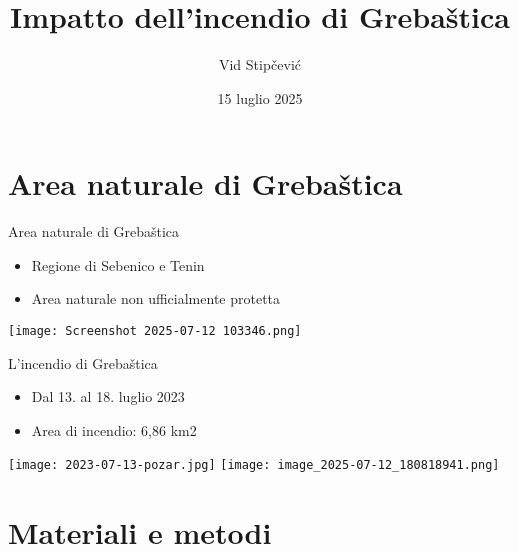 \documentclass{beamer} %
\title{Impatto dell'incendio di Grebaštica}
\author{Vid Stipčević}
\date{15 luglio 2025}
\begin{document}
\maketitle


\section{Area naturale di Grebaštica}

        \begin{frame}{Area naturale di Grebaštica}
                \begin{itemize}
                    \item {Regione di Sebenico e Tenin}
                    \item {Area naturale non ufficialmente protetta}
                \end{itemize}
                \begin{center}
                    \texttt{[image: Screenshot 2025-07-12 103346.png]}
                 \end{center}
        \end{frame}

        \begin{frame}{L'incendio di Grebaštica}
        \begin{multicols}{2}
                \begin{itemize}
                    \item {Dal 13. al 18. luglio 2023} 
                    \item {Area di incendio: 6,86 km2}
                \end{itemize}
            \columnbreak
            \begin{center}
                \texttt{[image: 2023-07-13-pozar.jpg]}
                \texttt{[image: image\_2025-07-12\_180818941.png]}
            \end{center}
            \end{multicols}
        \end{frame}

\section{Materiali e metodi}
\end{document}
